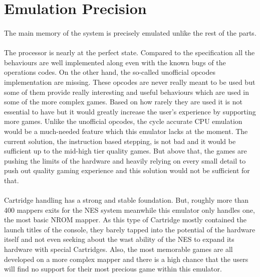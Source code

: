 \documentclass[]{report}
\begin{document}
\section{Emulation Precision}
\paragraph{ }
The main memory of the system is precisely emulated unlike the rest of the parts.

\paragraph{ }
The processor is nearly at the perfect state. Compared to the specification all the behaviours are well implemented along even with the known bugs of the operations codes. On the other hand, the so-called unofficial opcodes implementation are missing. These opcodes are never really meant to be used but some of them provide really interesting and useful behaviours which are used in some of the more complex games. Based on how rarely they are used it is not essential to have but it would greatly increase the user's experience by supporting more games. Unlike the unofficial opcodes, the cycle accurate CPU emulation would be a much-needed feature which this emulator lacks at the moment. The current solution, the instruction based stepping, is not bad and it would be sufficient up to the mid-high tier quality games. But above that, the games are pushing the limits of the hardware and heavily relying on every small detail to push out quality gaming experience and this solution would not be sufficient for that.

\paragraph{ } 
Cartridge handling has a strong and stable foundation. But, roughly more than 400 mappers exits for the NES system meanwhile this emulator only handles one, the most basic NROM mapper. As this type of Cartridge mostly contained the launch titles of the console, they barely tapped into the potential of the hardware itself and not even seeking about the wast ability of the NES to expand its hardware with special Cartridges. Also, the most memorable games are all developed on a more complex mapper and there is a high chance that the users will find no support for their most precious game within this emulator.
\end{document}
